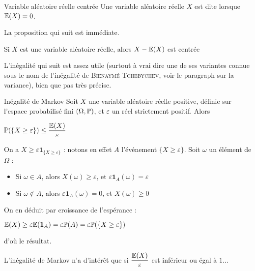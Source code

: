 \documentclass[12pt,a4paper]{report}
\begin{document}
\begin{definition}{Variable aléatoire réelle centrée}{}
Une variable aléatoire réelle $X$ est dite  lorsque $\mathbb{E}(X) = 0$.
\end{definition}

La proposition qui suit est immédiate.

\begin{proposition}{}{}
Si $X$ est une variable aléatoire réelle, alors $X-\mathbb{E}(X)$ est centrée
\end{proposition}

L'inégalité qui suit est assez utile (surtout à vrai dire une de ses variantes connue sous le nom de l'inégalité de \textsc{Bienaymé-Tchebychev}, voir le paragraph sur la variance), bien que pas très précise.

\begin{theoreme}{Inégalité de Markov}{}
Soit $X$ une variable aléatoire réelle positive, définie sur l'espace probabilisé fini $(\Omega, \mathbb{P})$, et $\varepsilon$ un réel strictement positif. Alors 
\begin{center}
$\mathbb{P}(\{X \ge \varepsilon\}) \le \dfrac{\mathbb{E}(X)}{\varepsilon}$
\end{center}
\end{theoreme}

\begin{demo}{}
On a $X \ge \varepsilon \textbf{1}_{\{X \ge \varepsilon\}}$ : notons en effet $A$ l'événement $\{X \ge \varepsilon\}$. Soit $\omega$ un élément de $\Omega$ : 
\begin{itemize}
	\item Si $\omega \in A$, alors $X(\omega) \ge \varepsilon$, et $\varepsilon \textbf{1}_A(\omega) = \varepsilon$
	\item Si $\omega \not \in A$, alors $\varepsilon \textbf{1}_A(\omega) = 0$, et $X(\omega) \ge 0$
\end{itemize}

On en déduit par croissance de l'espérance :
\begin{center}
$\mathbb{E}(X) \ge \varepsilon \mathbb{E}(\textbf{1}_A) = \varepsilon \mathbb{P}(A) = \varepsilon \mathbb{P}(\{X \ge \varepsilon \})$
\end{center}
d'où le résultat.
\end{demo}

\begin{remarque}{}
L'inégalité de Markov n'a d'intérêt que si $\dfrac{\mathbb{E}(X)}{\varepsilon}$ est inférieur ou égal à $1$...
\end{remarque}
\end{document}

